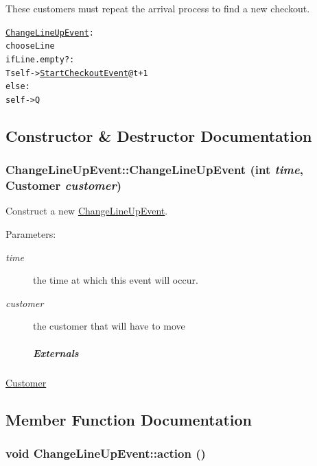 These customers must repeat the arrival process to find a new checkout.

\small\begin{alltt}
 \hyperlink{class_change_line_up_event}{ChangeLineUpEvent}:
   choose Line
   if Line.empty?:
     T self -> \hyperlink{class_start_checkout_event}{StartCheckoutEvent} @ t+1
   else:
     self -> Q
 \end{alltt}
\normalsize 
 

\subsection{Constructor \& Destructor Documentation}
\hypertarget{class_change_line_up_event_4a8c8f7b541c0a113a571348ba54c979}{
\subsubsection[{ChangeLineUpEvent}]{\setlength{\rightskip}{0pt plus 5cm}ChangeLineUpEvent::ChangeLineUpEvent (int {\em time}, \/  {\bf Customer} {\em customer})}}
\label{class_change_line_up_event_4a8c8f7b541c0a113a571348ba54c979}


Construct a new \hyperlink{class_change_line_up_event}{ChangeLineUpEvent}. 

\begin{Desc}
\item[Parameters:]
\begin{description}
\item[{\em time}]the time at which this event will occur. \item[{\em customer}]the customer that will have to move \subparagraph*{Externals}\end{description}
\end{Desc}
\hyperlink{class_customer}{Customer} 

\subsection{Member Function Documentation}
\hypertarget{class_change_line_up_event_e7a0c51e7d5fd3e2e126381045f22683}{
\subsubsection[{action}]{\setlength{\rightskip}{0pt plus 5cm}void ChangeLineUpEvent::action ()}}
\label{class_change_line_up_event_e7a0c51e7d5fd3e2e126381045f22683}


